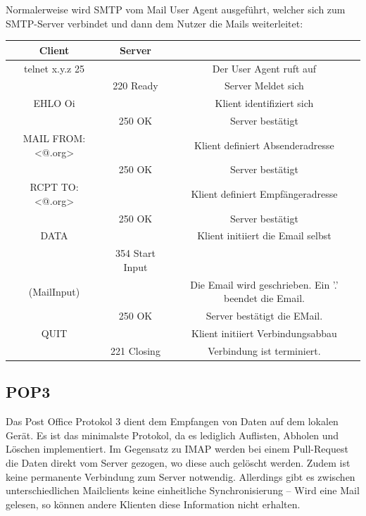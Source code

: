 \documentclass{article}
\begin{document}
    Normalerweise wird SMTP vom Mail User Agent ausgeführt, welcher sich zum SMTP-Server verbindet und dann dem Nutzer die Mails weiterleitet:
    
    \begin{center}
        \begin{tabular}{c|c|c}
            Client              &   Server          &                                   \\\hline
            telnet x.y.z 25     &                   & Der User Agent ruft auf           \\
                                &   220 Ready       & Server Meldet sich                \\
            EHLO Oi             &                   & Klient identifiziert sich         \\
                                &   250 OK          & Server bestätigt                  \\
            MAIL FROM: <@.org>  &                   & Klient definiert Absenderadresse  \\
                                &   250 OK          & Server bestätigt                  \\
            RCPT TO: <@.org>    &                   & Klient definiert Empfängeradresse \\  
                                &   250 OK          & Server bestätigt                  \\
            DATA                &                   & Klient initiiert die Email selbst \\
                            &   354 Start Input &                                   \\
            (MailInput)         &                   & Die Email wird geschrieben. Ein '.' beendet die Email.  \\
                                &   250 OK          & Server bestätigt die EMail.       \\ 
            QUIT                &                   & Klient initiiert Verbindungsabbau \\
                                &   221 Closing     & Verbindung ist terminiert.    \\
        \end{tabular}
    \end{center}
    
    \subsection{POP3}
    Das Post Office Protokol 3 dient dem Empfangen von Daten auf dem lokalen Gerät.
    Es ist das minimalste Protokol, da es lediglich Auflisten, Abholen und Löschen implementiert. 
    Im Gegensatz zu IMAP werden bei einem Pull-Request die Daten direkt vom Server gezogen, wo diese auch gelöscht werden. Zudem ist keine permanente Verbindung zum Server notwendig. Allerdings gibt es zwischen unterschiedlichen Mailclients keine einheitliche Synchronisierung -- Wird eine Mail gelesen, so können andere Klienten diese Information nicht erhalten.
\end{document}
